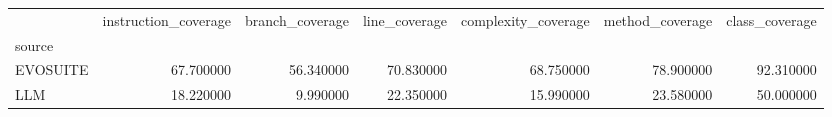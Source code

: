 \begin{tabular}{lrrrrrr}
\toprule
 & instruction_coverage & branch_coverage & line_coverage & complexity_coverage & method_coverage & class_coverage \\
source &  &  &  &  &  &  \\
\midrule
EVOSUITE & 67.700000 & 56.340000 & 70.830000 & 68.750000 & 78.900000 & 92.310000 \\
LLM & 18.220000 & 9.990000 & 22.350000 & 15.990000 & 23.580000 & 50.000000 \\
\bottomrule
\end{tabular}
